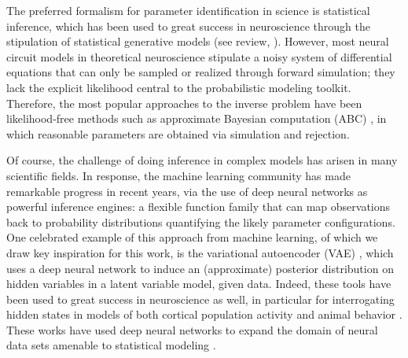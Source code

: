 \documentclass[11pt]{article}
\begin{document}
The preferred formalism for parameter identification in science is statistical inference, which has been used to great success in neuroscience through the stipulation of statistical generative models \cite{kass2001spike, brown1998statistical, paninski2004maximum, truccolo2005point, schneidman2006weak, druckmann2007novel, turner2007maximum, byron2009gaussian, macke2011empirical, park2011bayesian, granot2013stimulus, latimer2015single, lakshminarasimhan2018dynamic, duncker2019learning, ladenbauer2019inferring} (see review, \cite{paninski2018neural}). 
However, most neural circuit models in theoretical neuroscience stipulate a noisy system of differential equations that can only be sampled or realized through forward simulation; they lack the explicit likelihood central to the probabilistic modeling toolkit.
Therefore, the most popular approaches to the inverse problem have been likelihood-free methods such as approximate Bayesian computation (ABC) \cite{sisson2007sequential, liepe2014framework}, in which reasonable parameters are obtained via simulation and rejection.

Of course, the challenge of doing inference in complex models has arisen in many scientific fields.
In response, the machine learning community has made remarkable progress in recent years, via the use of deep neural networks as powerful inference engines: a flexible function family that can map observations back to probability distributions quantifying the likely parameter configurations. 
One celebrated example of this approach from machine learning, of which we draw key inspiration for this work, is the variational autoencoder (VAE) \cite{kingma2013auto, rezende2014stochastic}, which uses a deep neural network to induce an (approximate) posterior distribution on hidden variables in a latent variable model, given data. 
Indeed, these tools have been used to great success in neuroscience as well, in particular for interrogating hidden states in models of both cortical population activity \cite{gao2016linear, zhao2017recursive, barello2018sparse, pandarinath2018inferring} and animal behavior \cite{wiltschko2015mapping, johnson2016composing, batty2019behavenet}. 
These works have used deep neural networks to expand the domain of neural data sets amenable to statistical modeling \cite{paninski2018neural}.
\end{document}
